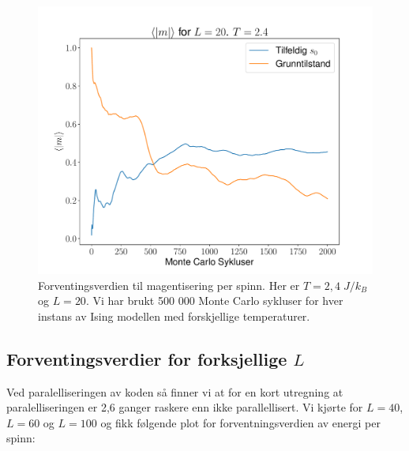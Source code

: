 \documentclass[reprint,english,notitlepage]{revtex4-2}  %
\begin{document}
\begin{figure}[H]
\centering
\includegraphics[scale=0.4, trim=2.5cm 0 0 0 ]{../Images/meanmT24L20.pdf}
\caption{Forventingsverdien til magentisering per spinn. Her er $T=2,4 \; J/k_B$ og $L = 20$. Vi har brukt 500 000 Monte Carlo sykluser for hver instans av Ising modellen med forskjellige temperaturer. }
\label{Fig:5m24}
\end{figure}

\subsection*{Forventingsverdier for forksjellige $L$}

Ved paralelliseringen av koden så finner vi at for en kort utregning at paralelliseringen er 2,6 ganger raskere enn ikke parallellisert. Vi kjørte for $L = 40$, $L = 60$ og $L = 100$ og fikk følgende plot for forventningsverdien av energi per spinn:
\end{document}
